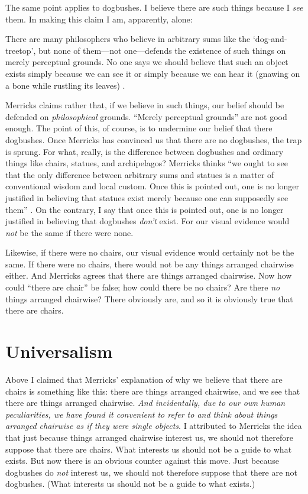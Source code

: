 \documentclass[11pt]{article}
\newenvironment{squote}{%
\begin{spacing}{1}
       	\begin{list}{}{%
\setlength{\labelwidth}{0pt}%
\rightmargin\leftmargin%
}
\item\relax
}{%
\end{list}%
\end{spacing}
}
\begin{document}
\begin{spacing}{1.25}
The same point applies to dogbushes.  I believe there are such things
because I {\em see} them.  In making this claim I am, apparently,
alone:

\begin{squote}
There are many philosophers who believe in arbitrary sums like the
`dog-and-treetop', but none of them---not one---defends the existence
of such things on merely perceptual grounds. No one says we should
believe that such an object exists simply because we can see it or
simply because we can hear it (gnawing on a bone while rustling its
leaves) \citep[74]{merricks2001a}.
\end{squote}

Merricks claims rather that, if we believe in such things, our belief
should be defended on {\em philosophical} grounds.  ``Merely
perceptual grounds'' are not good enough.  The point of this, of
course, is to undermine our belief that there dogbushes.  Once
Merricks has convinced us that there are no dogbushes, the trap is
sprung.  For what, really, is the difference between dogbushes and
ordinary things like chairs, statues, and archipelagos?  Merricks
thinks ``we ought to see that the only difference between arbitrary
sums and statues is a matter of conventional wisdom and local custom.
Once this is pointed out, one is no longer justified in believing that
statues exist merely because one can supposedly see them''
\citeyearpar[75]{merricks2001a}.  On the contrary, I say that once
this is pointed out, one is no longer justified in believing that
dogbushes {\em don't} exist.  For our visual evidence would {\em not}
be the same if there were none.

Likewise, if there were no chairs, our visual evidence would certainly
not be the same.  If there were no chairs, there would not be any
things arranged chairwise either.  And Merricks agrees that there are
things arranged chairwise.  Now how could ``there are chair'' be
false; how could there be no chairs?  Are there {\em no} things
arranged chairwise?  There obviously are, and so it is obviously true
that there are chairs.

\section{Universalism}
\label{universalism}
Above I claimed that Merricks' explanation of why we believe that
there are chairs is something like this: there are things arranged
chairwise, and we see that there are things arranged chairwise.  {\em
  And incidentally, due to our own human peculiarities, we have found
  it convenient to refer to and think about things arranged chairwise
  as if they were single objects}.  I attributed to Merricks the idea
that just because things arranged chairwise interest us, we should not
therefore suppose that there are chairs.  What interests us should not
be a guide to what exists.  But now there is an obvious counter
against this move.  Just because dogbushes do {\em not} interest us,
we should not therefore suppose that there are not dogbushes.  (What
interests us should not be a guide to what exists.)


\end{spacing}
\end{document}
